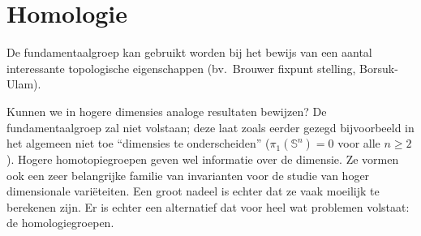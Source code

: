 \documentclass[12pt]{book}
\newtheorem{opmh}[stelh]{$\!\!$}
\newenvironment{opm}{\begin{opmh}{\em {\bf Opmerking }}}{\end{opmh}}
\begin{document}
%
%
%














%
\chapter{Homologie}

De fundamentaalgroep kan gebruikt worden bij het bewijs van een aantal
interessante topologische eigenschappen (bv.\ Brouwer fixpunt stelling,
Borsuk-Ulam). 

Kunnen we in hogere dimensies analoge resultaten bewijzen? De fundamentaalgroep zal niet volstaan; deze laat zoals eerder gezegd bijvoorbeeld in het algemeen niet toe ``dimensies te onderscheiden'' ($\pi_{1}(\mathbb{S}^{n})=0$ voor alle $n\geq 2$). Hogere homotopiegroepen geven wel informatie over de dimensie. Ze vormen ook een zeer belangrijke familie van invarianten voor de studie van hoger dimensionale vari\"eteiten. Een groot nadeel is echter dat ze vaak moeilijk te berekenen zijn. Er is echter een alternatief dat voor heel wat problemen volstaat: de homologiegroepen.
\end{document}
